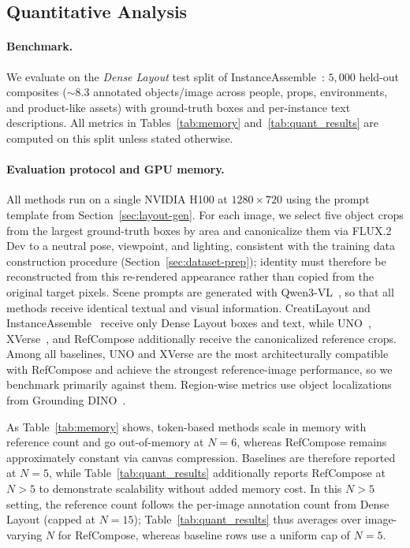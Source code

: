 \subsection{Quantitative Analysis}
\label{sec:quant}

\paragraph{Benchmark.}
We evaluate on the \emph{Dense Layout} test split of InstanceAssemble~\cite{xiang2025instanceassemble}: $5{,}000$ held-out composites ($\sim$8.3 annotated objects/image across people, props, environments, and product-like assets) with ground-truth boxes and per-instance text descriptions.
All metrics in Tables~\ref{tab:memory} and~\ref{tab:quant_results} are computed on this split unless stated otherwise.


\paragraph{Evaluation protocol and GPU memory.}
All methods run on a single NVIDIA H100 at \(1280 \times 720\) using the prompt template from Section~\ref{sec:layout-gen}. For each image, we select five object crops from the largest ground-truth boxes by area and canonicalize them via FLUX.2 Dev to a neutral pose, viewpoint, and lighting, consistent with the training data construction procedure (Section~\ref{sec:dataset-prep}); identity must therefore be reconstructed from this re-rendered appearance rather than copied from the original target pixels. Scene prompts are generated with Qwen3-VL~\cite{qwen3vl}, so that all methods receive identical textual and visual information. CreatiLayout and InstanceAssemble~\cite{xiang2025instanceassemble} receive only Dense Layout boxes and text, while UNO~\cite{wu2025uno}, XVerse~\cite{xverse2024}, and RefCompose additionally receive the canonicalized reference crops. Among all baselines, UNO and XVerse are the most architecturally compatible with RefCompose and achieve the strongest reference-image performance, so we benchmark primarily against them. Region-wise metrics use object localizations from Grounding DINO~\cite{liu2023grounding}.

As Table~\ref{tab:memory} shows, token-based methods scale in memory with reference count and go out-of-memory at \(N=6\), whereas RefCompose remains approximately constant via canvas compression. Baselines are therefore reported at \(N{=}5\), while Table~\ref{tab:quant_results} additionally reports RefCompose at \(N{>}5\) to demonstrate scalability without added memory cost. In this \(N{>}5\) setting, the reference count follows the per-image annotation count from Dense Layout (capped at \(N=15\)); Table~\ref{tab:quant_results} thus averages over image-varying \(N\) for RefCompose, whereas baseline rows use a uniform cap of \(N{=}5\).






